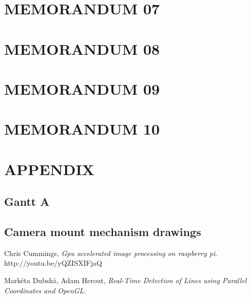 \documentclass[paper=A4, fontsize=11pt, titlepage]{article}
\numberwithin{equation}{section}
\numberwithin{figure}{section}
\numberwithin{table}{section}
\newcommand*{\sectionpostamble}{}
\newcommand*{\fromto}[1]{\def\sectionpostamble{#1}}
\begin{document}
\section{MEMORANDUM 07}




\clearpage


\fromto{Jun 16 - Jun 20}
\section{MEMORANDUM 08}




\clearpage


\fromto{Jun 23 - Jun 27}
\section{MEMORANDUM 09}




\clearpage


\fromto{Jun 30 - Jul 04}
\section{MEMORANDUM 10}




\clearpage


\section{APPENDIX}
\subsection{Gantt A}

\subsection{Camera mount mechanism drawings}



\clearpage

\begin{thebibliography}{9}
	Chris Cummings,
	\emph{Gpu accelerated image processing on raspberry pi}. http://youtu.be/yQZISXIFjaQ

	Markéta Dubská, Adam Herout,
	\emph{Real-Time Detection of Lines using Parallel Coordinates and OpenGL}. 

\end{thebibliography}
\end{document}
